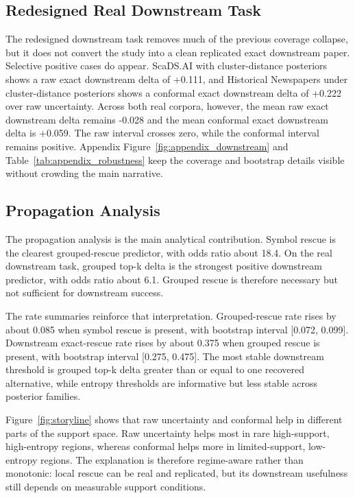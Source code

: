 \subsection{Redesigned Real Downstream Task}

The redesigned downstream task removes much of the previous coverage collapse, but it does not convert the study into a clean replicated exact downstream paper. Selective positive cases do appear. ScaDS.AI with cluster-distance posteriors shows a raw exact downstream delta of +0.111, and Historical Newspapers under cluster-distance posteriors shows a conformal exact downstream delta of +0.222 over raw uncertainty. Across both real corpora, however, the mean raw exact downstream delta remains -0.028 and the mean conformal exact downstream delta is +0.059. The raw interval crosses zero, while the conformal interval remains positive. Appendix Figure~\ref{fig:appendix_downstream} and Table~\ref{tab:appendix_robustness} keep the coverage and bootstrap details visible without crowding the main narrative.

\subsection{Propagation Analysis}

The propagation analysis is the main analytical contribution. Symbol rescue is the clearest grouped-rescue predictor, with odds ratio about 18.4. On the real downstream task, grouped top-k delta is the strongest positive downstream predictor, with odds ratio about 6.1. Grouped rescue is therefore necessary but not sufficient for downstream success.

The rate summaries reinforce that interpretation. Grouped-rescue rate rises by about 0.085 when symbol rescue is present, with bootstrap interval [0.072, 0.099]. Downstream exact-rescue rate rises by about 0.375 when grouped rescue is present, with bootstrap interval [0.275, 0.475]. The most stable downstream threshold is grouped top-k delta greater than or equal to one recovered alternative, while entropy thresholds are informative but less stable across posterior families.

Figure~\ref{fig:storyline} shows that raw uncertainty and conformal help in different parts of the support space. Raw uncertainty helps most in rare high-support, high-entropy regions, whereas conformal helps more in limited-support, low-entropy regions. The explanation is therefore regime-aware rather than monotonic: local rescue can be real and replicated, but its downstream usefulness still depends on measurable support conditions.
